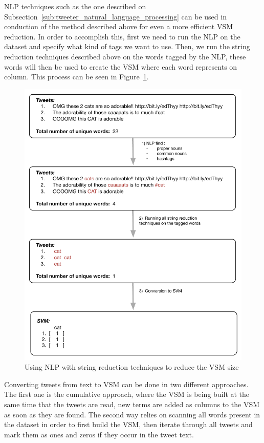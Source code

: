 \ac{NLP} techniques such as the one described on Subsection~\ref{sub:tweeter_natural_language_processing} can be used in conduction of the method described above for even a more efficient \ac{VSM} reduction. In order to accomplish this, first we need to run the \ac{NLP} on the dataset and specify what kind of tags we want to use. Then, we run the string reduction techniques described above on the words tagged by the \ac{NLP}, these words will then be used to create the \ac{VSM} where each word represents on column. This process can be seen in Figure~\ref{fig:string_nlp}.
\begin{figure}[htpb]
  \centering
  \includegraphics[width=0.8\linewidth]{./images/string_reduction_nlp.pdf}
  \caption{Using NLP with string reduction techniques to reduce the VSM size}
  \label{fig:string_nlp}
\end{figure}

Converting tweets from text to \ac{VSM} can be done in two different approaches. The first one is the cumulative approach, where the \ac{VSM} is being built at the same time that the tweets are read, new terms are added as columns to the \ac{VSM} as soon as they are found. The second way relies on scanning all words present in the dataset in order to first build the \ac{VSM}, then iterate through all tweets and mark them as ones and zeros if they occur in the tweet text. 


